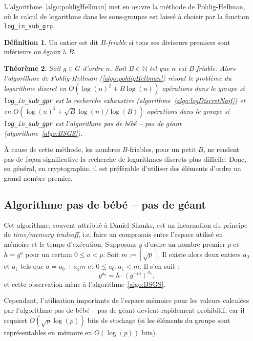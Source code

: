 \documentclass[a4paper, titlepage, 11pt]{article}
\newtheorem{theo}{Théorème}[section]
\theoremstyle{definition}
\newtheorem{defi}[theo]{Définition}
\theoremstyle{remark}
\def\N{\mathbb N}
\def\O{O}
\def\ceil #1{\left\lceil#1\right\rceil}
\begin{document}
L'algorithme~\ref{algo:pohligHellman} met en \oe uvre la méthode de Pohlig-Hellman, où le calcul de logarithme dans les sous-groupes est laissé à choisir par la fonction \verb|log_in_sub_grp|.

\begin{defi} Un entier est dit \textit{$B$-friable} si tous ses diviseurs premiers sont inférieurs ou égaux à $B$.
\end{defi}

\begin{theo}\label{theo:pohligHellman}
Soit $g \in G$ d'ordre $n$. Soit $B\in\N$ tel que $n$ est $B$-friable. Alors l'algorithme de Pohlig-Hellman (\ref{algo:pohligHellman}) résout le problème du logarithme discret en $\O(\log(n)^2 + B\log(n))$ opérations dans le groupe si \verb|log_in_sub_gpr| est la recherche exhaustive (algorithme~\ref{algo:logDiscretNaif}) et en $\O(\log(n)^2 + \sqrt{B}\log(n)/\log(B))$ opérations dans le groupe si \verb|log_in_sub_gpr| est l'algorithme pas de bébé -- pas de géant (algorithme~\ref{algo:BSGS}).
\end{theo}

\`A cause de cette méthode, les nombres $B$-friables, pour un petit $B$, ne rendent pas de façon significative la recherche de logarithmes discrets plus difficile. Donc, en général, en cryptographie, il est préférable d'utiliser des éléments d'ordre un grand nombre premier.

\subsection{Algorithme pas de bébé -- pas de géant}
\label{s-sec:BSGS}

Cet algorithme, souvent attribué à Daniel Shanks, est un incarnation du principe de \textit{time/memory tradeoff}, i.e. faire un compromis entre l'espace utilisé en mémoire et le temps d'exécution. Supposons $g$ d'ordre un nombre premier $p$ et $h = g^a$ pour un certain $0 \leqslant a < p$. Soit $m := \ceil{\sqrt{p}}$. Il existe alors deux entiers $a_0$ et $a_1$ tels que $a = a_0 + a_1m$ et $0 \leqslant a_0, a_1 < m$. Il s'en suit :
$$g^{a_0} = h\cdot{(g^{-m})}^{a_1},$$
et cette observation mène à l'algorithme~\ref{algo:BSGS}.

Cependant, l'utilisation importante de l'espace mémoire pour les valeurs calculées par l'algorithme pas de bébé -- pas de géant devient rapidement prohibitif, car il requiert $\O(\sqrt{p}\log(p))$ bits de stockage (si les éléments du groupe sont représentables en mémoire en $\O(\log(p))$ bits).
\end{document}
